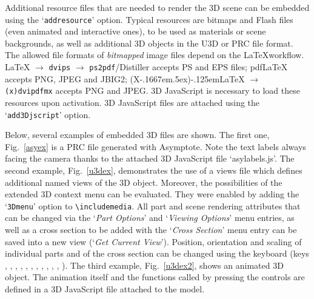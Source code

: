 \documentclass[a4paper]{article}
\def\pXepLaTeX{(X\kern-.1667em\lower.5ex\hbox{\reflectbox{E}})\kern-.125em\LaTeX}
\begin{document}
Additional resource files that are needed to render the 3D scene can be embedded using the `\verb+addresource+' option. Typical resources are bitmaps and Flash files (even animated and interactive ones), to be used as materials or scene backgrounds, as well as additional 3D objects in the U3D or PRC file format. The allowed file formats of \emph{bitmapped} image files depend on the \LaTeX workflow. \LaTeX{} $\rightarrow$ \verb+dvips+ $\rightarrow$ \verb+ps2pdf+/Distiller accepts PS and EPS files; pdf\LaTeX{} accepts PNG, JPEG and JBIG2; \pXepLaTeX{} $\rightarrow$ \verb+(x)dvipdfmx+ accepts  PNG and JPEG. 3D JavaScript is necessary to load these resources upon activation. 3D JavaScript files are attached using the `\verb+add3Djscript+' option.

Below, several examples of embedded 3D files are shown. The first one, Fig.~\ref{asyex} is a PRC file generated with Asymptote. Note the text labels always facing the camera thanks to the attached 3D JavaScript file `asylabels.js'. The second example, Fig.~\ref{u3dex}, demonstrates the use of a views file which defines additional named views of the 3D object. Moreover, the possibilities of the extended 3D context menu can be evaluated. They were enabled by adding the `\verb+3Dmenu+' option to \verb+\includemedia+. All part and scene rendering attributes that can be changed via the `\emph{\sffamily Part Options}' and `\emph{\sffamily Viewing Options}' menu entries, as well as a cross section to be added with the `\emph{\sffamily Cross Section}' menu entry can be saved into a new view (`\emph{\sffamily Get Current View}'). Position, orientation and scaling of individual parts and of the cross section can be changed using the keyboard (keys \keys{\arrowkeyleft}, \keys{\arrowkeyright}, \keys{\arrowkeyup}, \keys{\arrowkeydown}, , , , , , , , ). The third example, Fig.~\ref{u3dex2}, shows an animated 3D object. The animation itself and the functions called by pressing the controls are defined in a 3D JavaScript file attached to the model.
\end{document}
